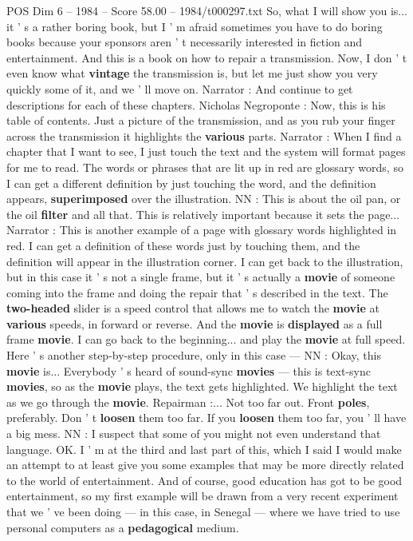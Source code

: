\begin{textsample}{POS Dim 6 – 1984 – Score 58.00 – 1984/t000297.txt}
So, what I will show you is... it ' s a rather boring book, but I ' m afraid sometimes you have to do boring books because your sponsors aren ' t necessarily interested in fiction and entertainment.
And this is a book on how to repair a transmission.
Now, I don ' t even know what \textbf{vintage} the transmission is, but let me just show you very quickly some of it, and we ' ll move on.
Narrator : And continue to get descriptions for each of these chapters.
Nicholas Negroponte : Now, this is his table of contents.
Just a picture of the transmission, and as you rub your finger across the transmission it highlights the \textbf{various} parts.
Narrator : When I find a chapter that I want to see, I just touch the text and the system will format pages for me to read.
The words or phrases that are lit up in red are glossary words, so I can get a different definition by just touching the word, and the definition appears, \textbf{superimposed} over the illustration.
NN : This is about the oil pan, or the oil \textbf{filter} and all that.
This is relatively important because it sets the page...
Narrator : This is another example of a page with glossary words highlighted in red.
I can get a definition of these words just by touching them, and the definition will appear in the illustration corner.
I can get back to the illustration, but in this case it ' s not a single frame, but it ' s actually a \textbf{movie} of someone coming into the frame and doing the repair that ' s described in the text.
The \textbf{two-headed} slider is a speed control that allows me to watch the \textbf{movie} at \textbf{various} speeds, in forward or reverse.
And the \textbf{movie} is \textbf{displayed} as a full frame \textbf{movie}.
I can go back to the beginning... and play the \textbf{movie} at full speed.
Here ' s another step-by-step procedure, only in this case — NN : Okay, this \textbf{movie} is...
Everybody ' s heard of sound-sync \textbf{movies} — this is text-sync \textbf{movies}, so as the \textbf{movie} plays, the text gets highlighted.
We highlight the text as we go through the \textbf{movie}.
Repairman :...
Not too far out.
Front \textbf{poles}, preferably.
Don ' t \textbf{loosen} them too far.
If you \textbf{loosen} them too far, you ' ll have a big mess.
NN : I suspect that some of you might not even understand that language.
OK.
I ' m at the third and last part of this, which I said I would make an attempt to at least give you some examples that may be more directly related to the world of entertainment.
And of course, good education has got to be good entertainment, so my first example will be drawn from a very recent experiment that we ' ve been doing — in this case, in Senegal — where we have tried to use personal computers as a \textbf{pedagogical} medium.

\end{textsample}
